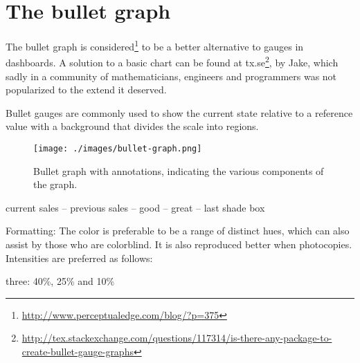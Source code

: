 \section{The bullet graph}

The bullet graph is considered\footnote{\protect\url{http://www.perceptualedge.com/blog/?p=375}} to be a  better alternative to gauges in dashboards. A solution to a basic chart can be found at tx.se\footnote{\url{http://tex.stackexchange.com/questions/117314/is-there-any-package-to-create-bullet-gauge-graphs}}, by Jake, which sadly in a community of mathematicians, engineers and programmers was not popularized to the extend it deserved. 

Bullet gauges are commonly used to show the current state relative to a reference value with a background that divides the scale into regions.

\begin{figure}[htbp]
\centering

\texttt{[image: ./images/bullet-graph.png]}
\caption{Bullet graph with annotations, indicating the various components of the graph.}
\end{figure}



current sales --
previous sales --
good -- 
great -- last shade box

Formatting: The color is preferable to be a range of distinct hues, which can also assist by those who are colorblind. It is also reproduced better when photocopies.  Intensities are preferred as follows:

three: 40\%, 25\% and 10\%

\makeatletter
\newenvironment {bulletgraph} {\luacode@begin\luacode@table@soft} {}
\makeatother



\providecommand{\bulletgauge}[4][]{
    \begin{tikzpicture}[scale=0.8, font=\arial]
    \begin{axis}[
       width=8cm,
       chartheight = 60pt,
       xtick pos=left, 
       xtick = {0,50,...,400, 450},
       ytick=\empty,
       xmin=50, xmax=450,
        tick align=outside,
        axis on top,
        every axis title/.style={
            at={(rel axis cs:0,0.5)},
            anchor=east,
            align=right,
            xshift=-0.5em
        },
        #1
    ]
    \pgfplotsinvokeforeach{#4}{
        \pgfplotsset{cycle list name=bullet}
        \addplot +[xbar, bar width=7ex ] coordinates {(##1,0)};
    }
    \addplot [fill= barcolour, xbar, barwidth ] coordinates {(#2,0)};    
    \addplot [mark=|, mark options={very thick}, mark size=2ex, ] coordinates {(#3,0)}; 
    \end{axis}
    \end{tikzpicture}
}

